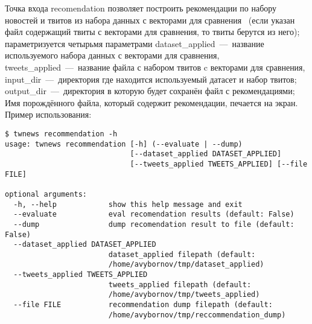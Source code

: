        Точка входа recomendation позволяет построить рекомендации по набору новостей и твитов из набора данных с векторами для сравнения
        ~(если указан файл содержащий твиты с векторами для сравнения, то твиты берутся из него);
        параметризуется четырьмя параметрами
        dataset\_applied~---~название используемого набора данных с векторами для сравнения,
        tweets\_applied~---~название файла с набором твитов c векторами для сравнения,
        input\_dir~---~директория где находится используемый датасет и набор твитов;
        output\_dir~---~директория в которую будет сохранён файл с рекомендациями;
        Имя порождённого файла, который содержит рекомендации, печается на экран. Пример использования:
        \begin{lstlisting}
$ twnews recommendation -h
usage: twnews recommendation [-h] (--evaluate | --dump)
                             [--dataset_applied DATASET_APPLIED]
                             [--tweets_applied TWEETS_APPLIED] [--file FILE]

optional arguments:
  -h, --help            show this help message and exit
  --evaluate            eval recomendation results (default: False)
  --dump                dump recomendation result to file (default: False)
  --dataset_applied DATASET_APPLIED
                        dataset_applied filepath (default:
                        /home/avybornov/tmp/dataset_applied)
  --tweets_applied TWEETS_APPLIED
                        tweets_applied filepath (default:
                        /home/avybornov/tmp/tweets_applied)
  --file FILE           recommendation dump filepath (default:
                        /home/avybornov/tmp/reccommendation_dump)

        \end{lstlisting}


